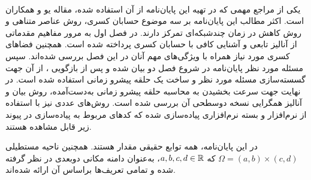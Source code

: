 \\
یکی از مراجع مهمی که در تهیه این پایان‌نامه از آن استفاده شده، مقاله یو و همکاران
\cite{Ref0YSXBP}
است.
اکثر مطالب این پایان‌نامه بر سه موضوع حسابان کسری، روش عناصر متناهی و روش کاهش در زمان چندشبکه‌ای تمرکز دارند.
در فصل اول به مرور مفاهیم مقدماتی از آنالیز تابعی و آشنایی کافی با حسابان کسری پرداخته شده است.
همچنین فضاهای کسری مورد نیاز همراه با ویژگی‌های مهم آنان در این فصل بررسی شده‌اند.
سپس مسئله
مورد نظر پایان‌نامه در شروع فصل دو بیان شده و پس از بازگویی
،
از آن جهت گسسته‌سازی مسئله
مورد نظر و ساخت یک حلقه پیشرو زمانی استفاده شده است.
در نهایت جهت سرعت بخشیدن به محاسبه حلقه پیشرو زمانی به‌دست‌آمده، روش
بیان و آنالیز همگرایی نسخه دوسطحی آن بررسی شده است.
روش‌های عددی نیز با استفاده از نرم‌افزار
\Matlab
و بسته نرم‌افزاری
\XBraid
پیاده‌سازی شده که کدهای مربوط به پیاده‌سازی در پیوند زیر قابل مشاهده هستند.
\begin{center}
\href{https://github.com/aforouz/Research_Papers/tree/main/MSc_Thesis}{}
\end{center}
در این پایان‌نامه، همه توابع حقیقی مقدار هستند.
همچنین ناحیه مستطیلی
$\Omega = (a, b) \times (c, d)$
که
$a,b,c,d \in \mathbb{R}$،
به‌عنوان دامنه مکانی دوبعدی در نظر گرفته شده و تمامی تعریف‌ها براساس آن ارائه شده‌اند.